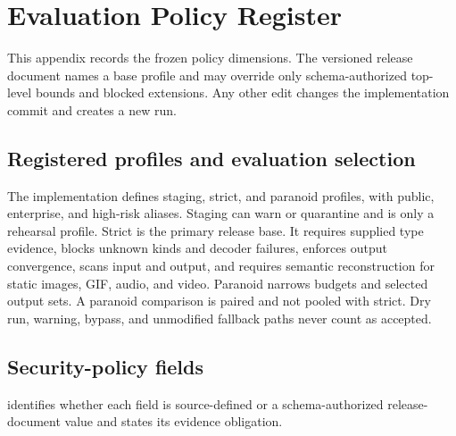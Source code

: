 \section{Evaluation Policy Register}
\label{app:policy-register}

This appendix records the frozen policy dimensions. The versioned release
document names a base profile and may override only schema-authorized top-level
bounds and blocked extensions. Any other edit changes the implementation commit
and creates a new run.

\subsection{Registered profiles and evaluation selection}
\label{subsec:registered-profiles}

The implementation defines staging, strict, and paranoid profiles, with public,
enterprise, and high-risk aliases. Staging can warn or quarantine and is only a
rehearsal profile. Strict is the primary release base. It requires supplied
type evidence, blocks unknown kinds and decoder failures, enforces output
convergence, scans input and output, and requires semantic reconstruction for
static images, GIF, audio, and video. Paranoid narrows budgets and selected
output sets. A paranoid comparison is paired and not pooled with strict. Dry
run, warning, bypass, and unmodified fallback paths never count as accepted.

\subsection{Security-policy fields}
\label{subsec:security-policy-fields}

 identifies whether each field is source-defined or a
schema-authorized release-document value and states its evidence obligation.

